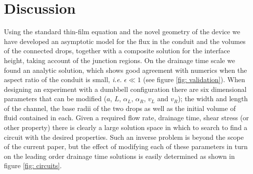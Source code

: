 \documentclass{jfm}
\begin{document}
\section{Discussion} \label{sec: discussion}

Using the standard thin-film equation and the novel geometry of the device    we have developed   an asymptotic model  for  the flux in the  conduit   and the  volumes of the connected drops, together with a composite solution for the interface  height,  taking account of the junction regions.
On the drainage time scale we found an analytic  solution, which shows good agreement with numerics when the aspect ratio of the  conduit  is small, {\it {i.e.}\ignorespaces} $\epsilon \ll1$ (see {f}igure \ref{fig: validation}). 
When designing an experiment with a  dumbbell configuration  there are six dimensional parameters that can be  modified ($a$, $L$, $\alpha_L$, $\alpha_R$, $v_L$ and $v_R$); the width and length of the channel, the base radii of the two drops as well as the initial volume of fluid contained in each.
 Given a required flow rate, drainage time, shear stress (or other property)  there is clearly a large solution space in which to  search to find a circuit with the desired properties.
 Such an inverse problem is beyond the scope of the current paper, but  the effect of modifying each of these parameters in turn on the leading order drainage time solutions is easily determined as shown in {f}igure \ref{fig: circuits}.
\end{document}
